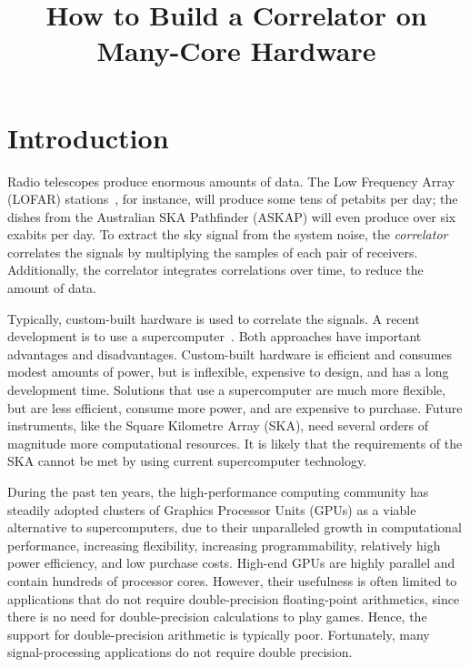 \documentclass{article}
\title{How to Build a Correlator on Many-Core Hardware}
\begin{document}
\maketitle

\begin{abstract}
\end{abstract}

\section{Introduction}


Radio telescopes produce enormous amounts of data.
The Low Frequency Array (LOFAR) stations~\cite{Butcher:04,deVos:09}, for
instance, will produce some tens of petabits per day; the dishes from the
Australian SKA Pathfinder (ASKAP) will even produce over six exabits per day.
To extract the sky signal from the system noise, the \emph{correlator\/}
correlates the signals by multiplying the samples of each pair of receivers.
Additionally, the correlator integrates correlations over time, to reduce
the amount of data.

Typically, custom-built hardware is used to correlate the signals.
A recent development is to use a supercomputer~\cite{Romein:06,Romein:09b}.
Both approaches have important advantages and disadvantages.
Custom-built hardware is efficient and consumes modest amounts of power, but is
inflexible, expensive to design, and has a long development time.
Solutions that use a supercomputer are much more flexible, but are less
efficient, consume more power, and are expensive to purchase.
Future instruments, like the Square Kilometre Array (SKA), need several orders
of magnitude more computational resources.
It is likely that the requirements of the SKA cannot be met by using
current supercomputer technology.

During the past ten years, the high-performance computing community has
steadily adopted clusters of Graphics Processor Units (GPUs) as a viable
alternative to supercomputers, due to their unparalleled growth in
computational performance, increasing flexibility, increasing programmability,
relatively high power efficiency, and low purchase costs.
High-end GPUs are highly parallel and contain hundreds of processor cores.
However, their usefulness is often limited to applications that do not require
double-precision floating-point arithmetics, since there is no need for
double-precision calculations to play games.
Hence, the support for double-precision arithmetic is typically poor.
Fortunately, many signal-processing applications do not require double
precision.
\end{document}
